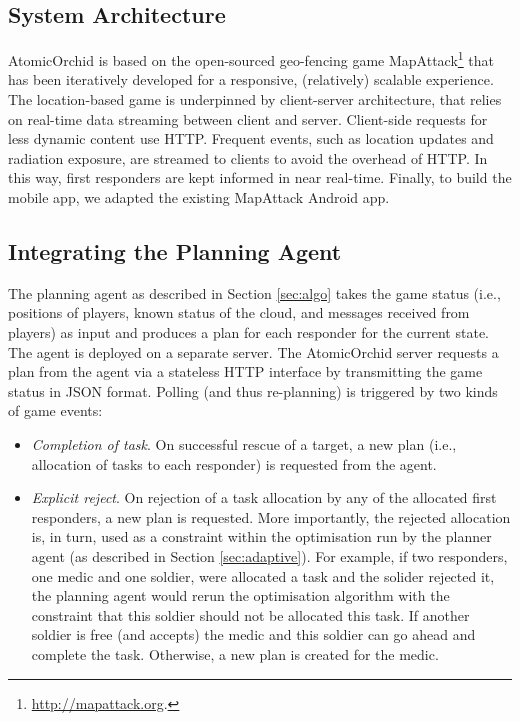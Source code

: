 \subsection{System Architecture}
\noindent AtomicOrchid is based on the open-sourced geo-fencing game MapAttack\footnote{\url{http://mapattack.org}.} that has been iteratively developed for a responsive, (relatively) scalable experience.  The location-based game is underpinned by client-server architecture, that relies on real-time data streaming between client and server. Client-side requests for less dynamic content use HTTP. Frequent events, such as location updates and radiation exposure, are streamed to clients to avoid the overhead of HTTP. In this way, first responders are kept informed in near real-time. Finally,  to build the mobile app, we adapted the existing MapAttack Android app.


\subsection{Integrating the Planning Agent}
\noindent The planning agent as described in Section \ref{sec:algo} takes the game status (i.e., positions of players, known status of the cloud, and messages received from players) as input and produces a plan for each responder  for the current state. The agent is deployed on a separate server. The AtomicOrchid server requests a plan from the agent via a stateless HTTP interface by transmitting the game status in JSON format. Polling (and thus re-planning) is triggered by two kinds of game events:
\begin{itemize}
\item \textit{Completion of task}. On successful rescue of a target, a new plan (i.e., allocation of tasks to each responder) is requested from the agent.
\item \textit{Explicit reject}. On rejection of a task allocation by any of the allocated first responders, a new plan is requested.  More importantly, the rejected allocation is, in turn, used as a constraint within the optimisation run by the planner agent (as described in Section \ref{sec:adaptive}). For example, if two responders, one medic and one soldier, were allocated a task and the solider rejected it, the planning agent would rerun the optimisation algorithm with the constraint that this soldier should not be allocated this task. If another soldier is free (and accepts) the medic and this soldier can go ahead and complete the task. Otherwise, a new plan is created for the medic.
\end{itemize} 

